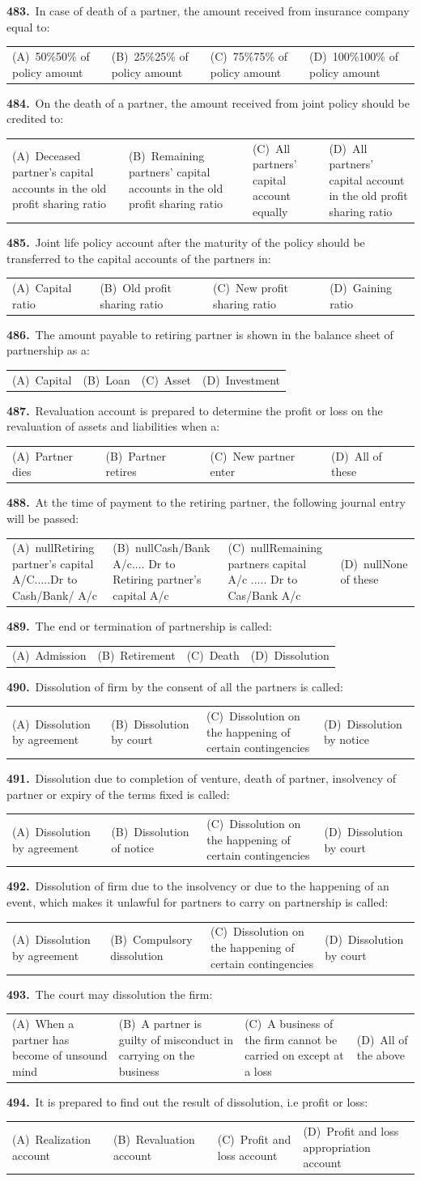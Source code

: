\documentclass[11pt,a4paper]{article}
\makeatletter
\newcommand{\mcq}[6]{%
  \Needspace{4\baselineskip}%
  \par\medskip\noindent\textbf{#1.}\ #2\par\nopagebreak
  \noindent\begin{tabularx}{\linewidth}{@{\hspace{1.5em}}*{4}{>{\raggedright\arraybackslash}X}@{}}
    (A)~#3 & (B)~#4 & (C)~#5 & (D)~#6
  \end{tabularx}\par}
\makeatother
\begin{document}
\mcq{483}{In case of death of a partner, the amount received from insurance company equal to:}{50\%50\% of policy amount}{25\%25\% of policy amount}{75\%75\% of policy amount}{100\%100\% of policy amount}
\mcq{484}{On the death of a partner, the amount received from joint policy should be credited to:}{Deceased partner’s capital accounts in the old profit sharing ratio}{Remaining partners’ capital accounts in the old profit sharing ratio}{All partners’ capital account equally}{All partners’ capital account in the old profit sharing ratio}
\mcq{485}{Joint life policy account after the maturity of the policy should be transferred to the capital accounts of the partners in:}{Capital ratio}{Old profit sharing ratio}{New profit sharing ratio}{Gaining ratio}
\mcq{486}{The amount payable to retiring partner is shown in the balance sheet of partnership as a:}{Capital}{Loan}{Asset}{Investment}
\mcq{487}{Revaluation account is prepared to determine the profit or loss on the revaluation of assets and liabilities when a:}{Partner dies}{Partner retires}{New partner enter}{All of these}
\mcq{488}{At the time of payment to the retiring partner, the following journal entry will be passed:}{nullRetiring partner's capital A/C.....Dr to Cash/Bank/ A/c}{nullCash/Bank A/c.... Dr to Retiring partner's capital A/c}{nullRemaining partners capital A/c ..... Dr to Cas/Bank A/c}{nullNone of these}
\mcq{489}{The end or termination of partnership is called:}{Admission}{Retirement}{Death}{Dissolution}
\mcq{490}{Dissolution of firm by the consent of all the partners is called:}{Dissolution by agreement}{Dissolution by court}{Dissolution on the happening of certain contingencies}{Dissolution by notice}
\mcq{491}{Dissolution due to completion of venture, death of partner, insolvency of partner or expiry of the terms fixed is called:}{Dissolution by agreement}{Dissolution of notice}{Dissolution on the happening of certain contingencies}{Dissolution by court}
\mcq{492}{Dissolution of firm due to the insolvency or due to the happening of an event, which makes it unlawful for partners to carry on partnership is called:}{Dissolution by agreement}{Compulsory dissolution}{Dissolution on the happening of certain contingencies}{Dissolution by court}
\mcq{493}{The court may dissolution the firm:}{When a partner has become of unsound mind}{A partner is guilty of misconduct in carrying on the business}{A business of the firm cannot be carried on except at a loss}{All of the above}
\mcq{494}{It is prepared to find out the result of dissolution, i.e profit or loss:}{Realization account}{Revaluation account}{Profit and loss account}{Profit and loss appropriation account}
\end{document}
